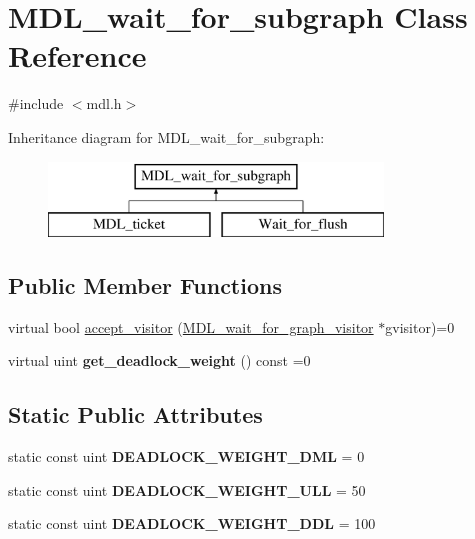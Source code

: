 \hypertarget{classMDL__wait__for__subgraph}{}\section{M\+D\+L\+\_\+wait\+\_\+for\+\_\+subgraph Class Reference}
\label{classMDL__wait__for__subgraph}


{\ttfamily \#include $<$mdl.\+h$>$}

Inheritance diagram for M\+D\+L\+\_\+wait\+\_\+for\+\_\+subgraph\+:\begin{figure}[H]
\begin{center}
\leavevmode
\includegraphics[height=2.000000cm]{classMDL__wait__for__subgraph}
\end{center}
\end{figure}
\subsection*{Public Member Functions}
\begin{DoxyCompactItemize}
\item 
virtual bool \mbox{\hyperlink{classMDL__wait__for__subgraph_ad14f796a25430ecabd24572efa22f3f5}{accept\+\_\+visitor}} (\mbox{\hyperlink{classMDL__wait__for__graph__visitor}{M\+D\+L\+\_\+wait\+\_\+for\+\_\+graph\+\_\+visitor}} $\ast$gvisitor)=0
\item 
\mbox{\label{classMDL__wait__for__subgraph_af2324a32575e85834c2561dc65df8f1b}} 
virtual uint {\bfseries get\+\_\+deadlock\+\_\+weight} () const =0
\end{DoxyCompactItemize}
\subsection*{Static Public Attributes}
\begin{DoxyCompactItemize}
\item 
\mbox{\label{classMDL__wait__for__subgraph_a5119d1bfb2134d441d8bda0cfb4eb738}} 
static const uint {\bfseries D\+E\+A\+D\+L\+O\+C\+K\+\_\+\+W\+E\+I\+G\+H\+T\+\_\+\+D\+ML} = 0
\item 
\mbox{\label{classMDL__wait__for__subgraph_a1e7921734bd77f21429dc603e676a49c}} 
static const uint {\bfseries D\+E\+A\+D\+L\+O\+C\+K\+\_\+\+W\+E\+I\+G\+H\+T\+\_\+\+U\+LL} = 50
\item 
\mbox{\label{classMDL__wait__for__subgraph_a70d33347828ce8ca522fa494f98bfbc4}} 
static const uint {\bfseries D\+E\+A\+D\+L\+O\+C\+K\+\_\+\+W\+E\+I\+G\+H\+T\+\_\+\+D\+DL} = 100
\end{DoxyCompactItemize}


